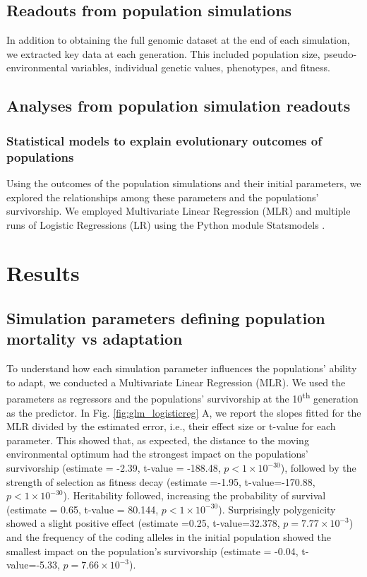 \documentclass{article}
\begin{document}
\subsection{Readouts from population simulations}
In addition to obtaining the full genomic dataset at the end of each simulation, we extracted key data at each generation. This included population size, pseudo-environmental variables, individual genetic values, phenotypes, and fitness.

\subsection{Analyses from population simulation readouts}
\subsubsection{Statistical models to explain evolutionary outcomes of populations}
Using the outcomes of the population simulations and their initial parameters, we explored the relationships among these parameters and the populations’ survivorship. We employed Multivariate Linear Regression (MLR) and multiple runs of Logistic Regressions (LR) using the Python module Statsmodels \citep{Seabold2010-ec}. 

\section{Results}
\subsection{Simulation parameters defining population mortality vs adaptation}
To understand how each simulation parameter influences the populations' ability to adapt, we conducted a Multivariate Linear Regression (MLR). We used the parameters as regressors and the populations' survivorship at the 10\textsuperscript{th} generation as the predictor. In Fig. \ref{fig:glm_logisticreg} A, we report the slopes fitted for the MLR divided by the estimated error, i.e., their effect size or t-value for each parameter. This showed that, as expected, the distance to the moving environmental optimum had the strongest impact on the populations' survivorship (estimate = -2.39, t-value = -188.48, $p<1 \times 10^{-30}$), followed by the strength of selection as fitness decay (estimate =-1.95, t-value=-170.88, $p<1 \times 10^{-30}$). Heritability followed, increasing the probability of survival (estimate = 0.65, t-value = 80.144, $p<1 \times 10^{-30}$). Surprisingly polygenicity showed a slight positive effect (estimate =0.25, t-value=32.378, $p=7.77 \times 10^{-3}$) and the frequency of the coding alleles in the initial population showed the smallest impact on the population's survivorship (estimate = -0.04, t-value=-5.33, $p=7.66 \times 10^{-3}$).
\end{document}

